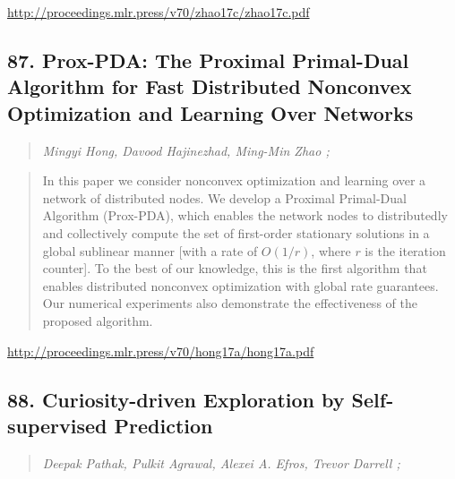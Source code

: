 \documentclass{article}
\begin{document}
\href{http://proceedings.mlr.press/v70/zhao17c/zhao17c.pdf}{http://proceedings.mlr.press/v70/zhao17c/zhao17c.pdf}

\subsection{87. Prox-PDA: The Proximal Primal-Dual Algorithm for Fast Distributed Nonconvex Optimization and Learning Over Networks}

\begin{quote}
\footnotesize{\textit{Mingyi Hong, Davood Hajinezhad, Ming-Min Zhao ;}}
\end{quote}

\begin{quote}
    In this paper we consider nonconvex optimization and learning over a network of distributed nodes. We develop a Proximal Primal-Dual Algorithm (Prox-PDA), which enables the network nodes to distributedly and collectively compute the set of first-order stationary solutions in a global sublinear manner [with a rate of $O(1/r)$, where $r$ is the iteration counter]. To the best of our knowledge, this is the first algorithm that enables distributed nonconvex optimization with global rate guarantees. Our numerical experiments also demonstrate the effectiveness of the proposed algorithm.  \end{quote}

\href{http://proceedings.mlr.press/v70/hong17a/hong17a.pdf}{http://proceedings.mlr.press/v70/hong17a/hong17a.pdf}

\subsection{88. Curiosity-driven Exploration by Self-supervised Prediction}

\begin{quote}
\footnotesize{\textit{Deepak Pathak, Pulkit Agrawal, Alexei A. Efros, Trevor Darrell ;}}
\end{quote}
\end{document}
